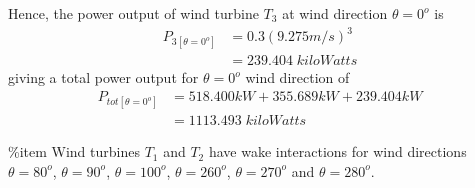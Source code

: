 Hence, the power output of wind turbine $T_3$ at wind direction $\theta=0^o$ is
    \begin{align*}
        P_{3[\theta=0^o]} &= 0.3(9.275m/s)^3 \\
        &= 239.404\;kiloWatts
    \end{align*}
giving a total power output for $\theta=0^o$ wind direction of
	\begin{align*}
		P_{tot[\theta=0^o]} &= 518.400kW + 355.689kW + 239.404kW \\
		&=1113.493\;kiloWatts
	\end{align*}
	
	
		\%item Wind turbines $T_1$ and $T_2$ have wake interactions for wind directions $\theta=80^o$, $\theta=90^o$, $\theta=100^o$, $\theta=260^o$, $\theta=270^o$ and $\theta=280^o$.
	
	
	
	
	
	
	
	
	
	
	
	
	
	
	
	
	
	
	